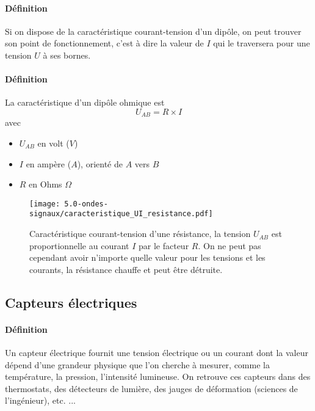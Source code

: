 \paragraph{Définition} Si on dispose de la caractéristique courant-tension d'un dipôle, on peut trouver son point de fonctionnement, c'est à dire la valeur de $I$ qui le traversera pour une tension $U$ à ses bornes.
\paragraph{Définition} La caractéristique d'un dipôle ohmique est $$U_{AB}= R\times I$$ avec \begin{itemize}
   \item $U_{AB}$ en volt ($V$)
   \item $I$ en ampère ($A$), orienté de $A$ vers $B$ 
   \item $R$ en Ohms $\Omega$
\end{itemize}

\begin{figure}[h!]
  \begin{center}
      \texttt{[image: 5.0-ondes-signaux/caracteristique\_UI\_resistance.pdf]}
  \end{center}
  \caption{Caractéristique courant-tension d'une résistance, la tension $U_{AB}$ est proportionnelle au courant $I$ par le facteur $R$.  On ne peut pas cependant avoir n'importe quelle valeur pour les tensions et les courants, la résistance chauffe et peut être détruite.}
  \label{fig:caracteristique_UI_resistance}
\end{figure}


\subsection{Capteurs électriques}
\paragraph{Définition}Un capteur électrique fournit une tension électrique ou un courant dont la valeur dépend d'une grandeur physique que l'on cherche à mesurer, comme la température, la pression, l'intensité lumineuse. On retrouve ces capteurs dans des thermostats, des détecteurs de lumière, des jauges de déformation (sciences de l'ingénieur), etc. ...
